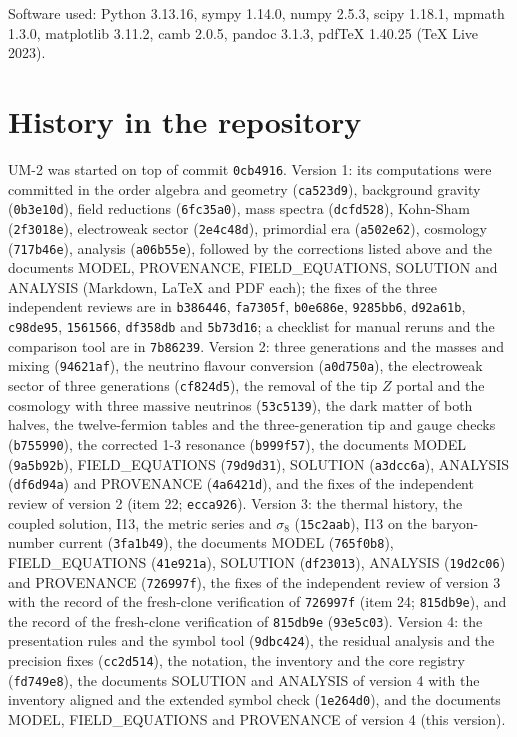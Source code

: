 \documentclass[
  10pt,
]{article}
\begin{document}
Software used: Python 3.13.16, sympy 1.14.0, numpy 2.5.3, scipy 1.18.1,
mpmath 1.3.0, matplotlib 3.11.2, camb 2.0.5, pandoc 3.1.3, pdfTeX
1.40.25 (TeX Live 2023).

\hypertarget{history-in-the-repository}{%
\section{History in the repository}\label{history-in-the-repository}}

UM-2 was started on top of commit \texttt{0cb4916}. Version 1: its
computations were committed in the order algebra and geometry
(\texttt{ca523d9}), background gravity (\texttt{0b3e10d}), field
reductions (\texttt{6fc35a0}), mass spectra (\texttt{dcfd528}),
Kohn-Sham (\texttt{2f3018e}), electroweak sector (\texttt{2e4c48d}),
primordial era (\texttt{a502e62}), cosmology (\texttt{717b46e}),
analysis (\texttt{a06b55e}), followed by the corrections listed above
and the documents MODEL, PROVENANCE, FIELD\_EQUATIONS, SOLUTION and
ANALYSIS (Markdown, LaTeX and PDF each); the fixes of the three
independent reviews are in \texttt{b386446}, \texttt{fa7305f},
\texttt{b0e686e}, \texttt{9285bb6}, \texttt{d92a61b}, \texttt{c98de95},
\texttt{1561566}, \texttt{df358db} and \texttt{5b73d16}; a checklist for
manual reruns and the comparison tool are in \texttt{7b86239}. Version
2: three generations and the masses and mixing (\texttt{94621af}), the
neutrino flavour conversion (\texttt{a0d750a}), the electroweak sector
of three generations (\texttt{cf824d5}), the removal of the tip \(Z\)
portal and the cosmology with three massive neutrinos
(\texttt{53c5139}), the dark matter of both halves, the twelve-fermion
tables and the three-generation tip and gauge checks (\texttt{b755990}),
the corrected 1-3 resonance (\texttt{b999f57}), the documents MODEL
(\texttt{9a5b92b}), FIELD\_EQUATIONS (\texttt{79d9d31}), SOLUTION
(\texttt{a3dcc6a}), ANALYSIS (\texttt{df6d94a}) and PROVENANCE
(\texttt{4a6421d}), and the fixes of the independent review of version 2
(item 22; \texttt{ecca926}). Version 3: the thermal history, the coupled
solution, I13, the metric series and \(\sigma_8\) (\texttt{15c2aab}),
I13 on the baryon-number current (\texttt{3fa1b49}), the documents MODEL
(\texttt{765f0b8}), FIELD\_EQUATIONS (\texttt{41e921a}), SOLUTION
(\texttt{df23013}), ANALYSIS (\texttt{19d2c06}) and PROVENANCE
(\texttt{726997f}), the fixes of the independent review of version 3
with the record of the fresh-clone verification of \texttt{726997f}
(item 24; \texttt{815db9e}), and the record of the fresh-clone
verification of \texttt{815db9e} (\texttt{93e5c03}). Version 4: the
presentation rules and the symbol tool (\texttt{9dbc424}), the residual
analysis and the precision fixes (\texttt{cc2d514}), the notation, the
inventory and the core registry (\texttt{fd749e8}), the documents
SOLUTION and ANALYSIS of version 4 with the inventory aligned and the
extended symbol check (\texttt{1e264d0}), and the documents MODEL,
FIELD\_EQUATIONS and PROVENANCE of version 4 (this version).
\end{document}
